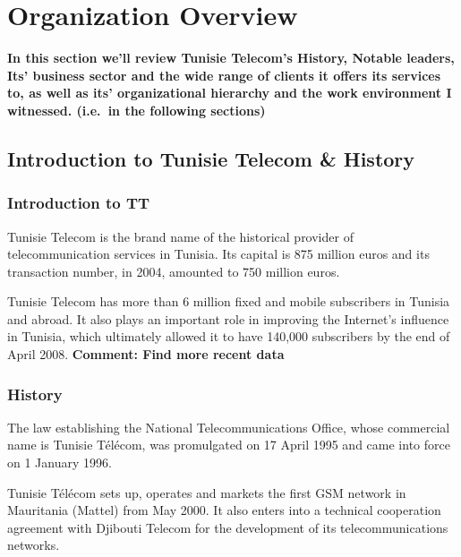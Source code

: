 ﻿\chapter{Organization Overview} %
\label{chap:org}
\textbf{In this section we'll review Tunisie Telecom's History, Notable leaders, Its' business sector and the wide range of clients it offers its services to, as well as its' organizational hierarchy and the work environment I witnessed.  (i.e.\ in the following sections)}
\section{Introduction to Tunisie Telecom \& History} %

{}%
\subsection{Introduction to TT}%
Tunisie Telecom is the brand name of the historical provider of telecommunication services in Tunisia. Its capital is 875 million euros and its transaction number, in 2004, amounted to 750 million euros.

Tunisie Telecom has more than 6 million fixed and mobile subscribers in Tunisia and abroad. It also plays an important role in improving the Internet's influence in Tunisia, which ultimately allowed it to have 140,000 subscribers by the end of April 2008.
\textbf{Comment: Find more recent data}

\subsection{History}
The law establishing the National Telecommunications Office, whose commercial name is Tunisie Télécom, was promulgated on 17 April 1995 and came into force on 1 January 1996.

Tunisie Télécom sets up, operates and markets the first GSM network in Mauritania (Mattel) from May 2000. It also enters into a technical cooperation agreement with Djibouti Telecom for the development of its telecommunications networks.

